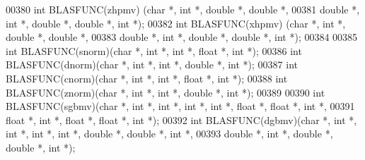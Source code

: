 \begin{DoxyCode}
00380 \textcolor{keywordtype}{int} BLASFUNC(zhpmv) (\textcolor{keywordtype}{char} *, \textcolor{keywordtype}{int} *, \textcolor{keywordtype}{double}  *, \textcolor{keywordtype}{double} *,
00381              \textcolor{keywordtype}{double}  *, \textcolor{keywordtype}{int} *, \textcolor{keywordtype}{double} *, \textcolor{keywordtype}{double} *, \textcolor{keywordtype}{int} *);
00382 \textcolor{keywordtype}{int} BLASFUNC(xhpmv) (\textcolor{keywordtype}{char} *, \textcolor{keywordtype}{int} *, \textcolor{keywordtype}{double}  *, \textcolor{keywordtype}{double} *,
00383              \textcolor{keywordtype}{double}  *, \textcolor{keywordtype}{int} *, \textcolor{keywordtype}{double} *, \textcolor{keywordtype}{double} *, \textcolor{keywordtype}{int} *);
00384 
00385 \textcolor{keywordtype}{int} BLASFUNC(snorm)(\textcolor{keywordtype}{char} *, \textcolor{keywordtype}{int} *, \textcolor{keywordtype}{int} *, \textcolor{keywordtype}{float}  *, \textcolor{keywordtype}{int} *);
00386 \textcolor{keywordtype}{int} BLASFUNC(dnorm)(\textcolor{keywordtype}{char} *, \textcolor{keywordtype}{int} *, \textcolor{keywordtype}{int} *, \textcolor{keywordtype}{double} *, \textcolor{keywordtype}{int} *);
00387 \textcolor{keywordtype}{int} BLASFUNC(cnorm)(\textcolor{keywordtype}{char} *, \textcolor{keywordtype}{int} *, \textcolor{keywordtype}{int} *, \textcolor{keywordtype}{float}  *, \textcolor{keywordtype}{int} *);
00388 \textcolor{keywordtype}{int} BLASFUNC(znorm)(\textcolor{keywordtype}{char} *, \textcolor{keywordtype}{int} *, \textcolor{keywordtype}{int} *, \textcolor{keywordtype}{double} *, \textcolor{keywordtype}{int} *);
00389 
00390 \textcolor{keywordtype}{int} BLASFUNC(sgbmv)(\textcolor{keywordtype}{char} *, \textcolor{keywordtype}{int} *, \textcolor{keywordtype}{int} *, \textcolor{keywordtype}{int} *, \textcolor{keywordtype}{int} *, \textcolor{keywordtype}{float}  *, \textcolor{keywordtype}{float}  *, \textcolor{keywordtype}{int} *,
00391             \textcolor{keywordtype}{float}  *, \textcolor{keywordtype}{int} *, \textcolor{keywordtype}{float}  *, \textcolor{keywordtype}{float}  *, \textcolor{keywordtype}{int} *);
00392 \textcolor{keywordtype}{int} BLASFUNC(dgbmv)(\textcolor{keywordtype}{char} *, \textcolor{keywordtype}{int} *, \textcolor{keywordtype}{int} *, \textcolor{keywordtype}{int} *, \textcolor{keywordtype}{int} *, \textcolor{keywordtype}{double} *, \textcolor{keywordtype}{double} *, \textcolor{keywordtype}{int} *,
00393             \textcolor{keywordtype}{double} *, \textcolor{keywordtype}{int} *, \textcolor{keywordtype}{double} *, \textcolor{keywordtype}{double} *, \textcolor{keywordtype}{int} *);

\end{DoxyCode}
